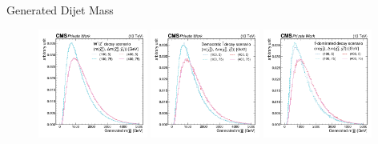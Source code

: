 \begin{frame}[fragile]{Generated Dijet Mass}
  \begin{figure}[htpb]
    \centering
    \includegraphics[width=0.32\textwidth]{fig/sig/Sig_wz_mjj.pdf}
    \includegraphics[width=0.32\textwidth]{fig/sig/Sig_democratic_mjj.pdf}
    \includegraphics[width=0.32\textwidth]{fig/sig/Sig_stau_mjj.pdf}
  \end{figure}	
\end{frame}


